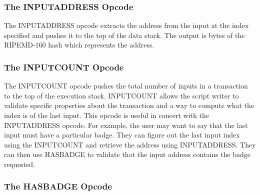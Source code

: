 \documentclass{article}
\begin{document}
\subsubsection{The INPUTADDRESS Opcode}

\begin{center}
\end{center}

The INPUTADDRESS \gls{opcode} extracts the address from the input at the index specified
and pushes it to the top of the data stack. The output is bytes of the RIPEMD-160
hash which represents the address.

\subsubsection{The INPUTCOUNT Opcode}

\begin{center}
\end{center}

The INPUTCOUNT opcode pushes the total number of inputs in a transaction to the
top of the execution stack. INPUTCOUNT allows the script writer to validate specific
properties about the transaction and a way to compute what the index is of the
last input. This opcode is useful in concert with the INPUTADDRESS opcode.
For example, the user may want to say that the last input must have a particular badge.
They can figure out the last input index using the INPUTCOUNT and retrieve the
address using INPUTADDRESS. They can then use HASBADGE to validate that the input
address contains the badge requested.

\subsubsection{The HASBADGE Opcode}
\end{document}
